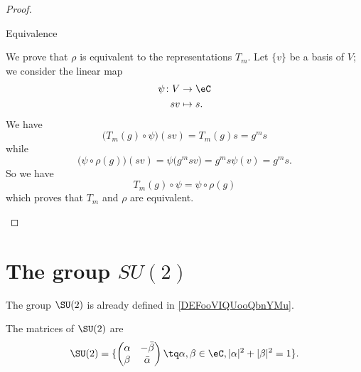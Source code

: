 \begin{proof}
\begin{subproof}
        \item[Equivalence]

            We prove that \( \rho\) is equivalent to the representations \( T_m\). Let \( \{ v \}\) be a basis of \( V\); we consider the linear map
            \begin{equation}
                \begin{aligned}
                    \psi\colon V&\to \eC \\
                    sv&\mapsto s. 
                \end{aligned}
            \end{equation}
            We have
            \begin{equation}
                \big( T_m(g)\circ \psi \big)(sv)=T_m(g)s=g^ms
            \end{equation}
            while
            \begin{equation}
                \big( \psi\circ\rho(g) \big)(sv)=\psi\big( g^msv \big)=g^ms\psi(v)=g^ms.
            \end{equation}
            So we have
            \begin{equation}
                T_m(g)\circ \psi=\psi\circ\rho(g)
            \end{equation}
            which proves that \( T_m\) and \( \rho\) are equivalent.
    \end{subproof}
\end{proof}

\section{The group \texorpdfstring{$SU(2)$}{SU2}}

The group \( \SU(2)\) is already defined in \ref{DEFooVIQUooQbnYMu}.

\begin{proposition}       \label{PROPooZMPLooUFyAPW}
    The matrices of \( \SU(2)\) are
    \begin{equation}
        \SU(2)=\{ \begin{pmatrix}
        \alpha    &   -\bar \beta    \\ 
    \beta    &   \bar \alpha    
\end{pmatrix}\tq \alpha,\beta\in \eC,| \alpha |^2+| \beta |^2=1\}.
    \end{equation}
\end{proposition}

